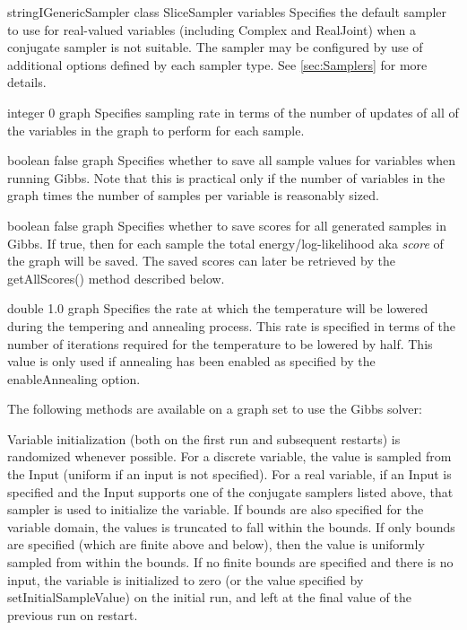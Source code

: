 
{\ifmatlab string\fi \ifjava IGenericSampler class\fi}
{SliceSampler}
{variables}
{Specifies the default sampler to use for real-valued variables (including Complex and RealJoint) when a conjugate sampler is not suitable. The sampler may be configured by use of additional options defined by each sampler type. See \autoref{sec:Samplers} for more details.}


{integer}
{0}
{graph}
{Specifies sampling rate in terms of the number of updates of all of the variables in the graph to perform for each sample.}



{boolean}
{false}
{graph}
{Specifies whether to save all sample values for variables when running Gibbs. Note that this is practical only if the number of variables in the graph times the number of samples per variable is reasonably sized.}


{boolean}
{false}
{graph}
{Specifies whether to save scores for all generated samples in Gibbs. If true, then for each sample the total energy/log-likelihood aka \emph{score} of the graph will be saved. The saved scores can later be retrieved by the getAllScores() method described below.}


{double}
{1.0}
{graph}
{Specifies the rate at which the temperature will be lowered during the tempering and annealing process. This rate is specified in terms of the number of iterations required for the temperature to be lowered by half. This value is only used if annealing has been enabled as specified by the enableAnnealing option.}


The following methods are available on a graph set to use the Gibbs solver:

Variable initialization (both on the first run and subsequent restarts) is randomized whenever possible.  For a discrete variable, the value is sampled from the Input (uniform if an input is not specified).  For a real variable, if an Input is specified and the Input supports one of the conjugate samplers listed above, that sampler is used to initialize the variable.  If bounds are also specified for the variable domain, the values is truncated to fall within the bounds.  If only bounds are specified (which are finite above and below), then the value is uniformly sampled from within the bounds.  If no finite bounds are specified and there is no input, the variable is initialized to zero (or the value specified by setInitialSampleValue) on the initial run, and left at the final value of the previous run on restart.

